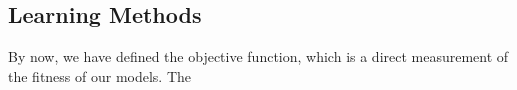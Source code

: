 \subsection {Learning Methods}
By now, we have defined the objective function, which is a direct measurement of the fitness of our models. The 
